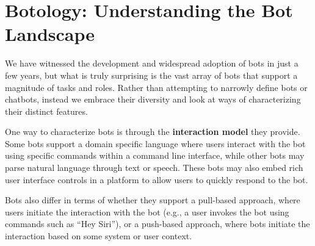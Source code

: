 \documentclass{sig-alternate}
\newcommand{\cl}[1]{\textcolor{blue}{{\it [Carly says: #1]}}}
\newcommand{\cl}[1]{}
\begin{document}
\section{Botology: Understanding the Bot Landscape}


We have witnessed the development and widespread adoption of bots in just a few years, but what is truly surprising is the vast array of bots that support a magnitude of tasks and roles.  
Rather than attempting to narrowly define bots or chatbots, instead we embrace their diversity and look at ways of characterizing their distinct features.

One way to characterize bots is through the \textbf{interaction model} they provide. 
Some bots support a domain specific language where users interact with the bot using specific commands within a command line interface, while other bots may parse natural language through text or speech.  
These bots may also embed rich user interface controls in a platform to allow users to quickly respond to the bot.

Bots also differ in terms of whether they support a pull-based approach, where users initiate the interaction with the bot (e.g., a user invokes the bot using commands such as ``Hey Siri''), or a push-based approach, where bots initiate the interaction based on some system or user context. 
\end{document}

